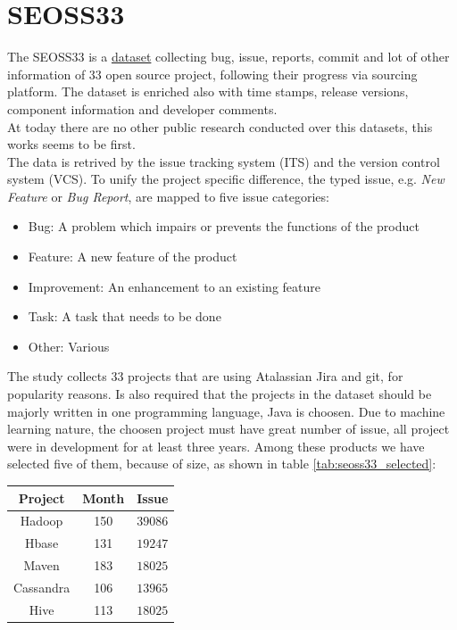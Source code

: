 \documentclass[%
    corpo=12pt,
    twoside,
    oldstyle,
    autoretitolo,
    greek,
    evenboxes,
]{toptesi}
\begin{document}
\section{SEOSS33}
The SEOSS33\cite{SEOSS33} is a \href{https://doi.org/10.7910/DVN/PDDZ4Q}{dataset} collecting bug, issue, reports, commit and lot of other information of 33 open source project, following their progress via sourcing platform. The dataset is enriched also with time stamps, release versions, component information and developer comments.\\
At today there are no other public research conducted over this datasets, this works seems to be first.\\
The data is retrived by the issue tracking system (ITS) and the version control system (VCS).
To unify the project specific difference, the typed issue, e.g. \textit{New Feature} or \textit{Bug Report}, are mapped to five issue categories:
\begin{itemize}
  \item Bug: A problem which impairs or prevents the functions of the product
  \item Feature: A new feature of the product
  \item Improvement: An enhancement to an existing feature
  \item Task: A task that needs to be done
  \item Other: Various
\end{itemize}
The study collects 33 projects that are using Atalassian Jira and git, for popularity reasons. Is also required that the projects in the dataset should be majorly written in one programming language, Java is choosen. Due to machine learning nature, the choosen project must have great number of issue, all project were in development for at least three years. Among these products we have selected five of them, because of size, as shown in table \ref{tab:seoss33_selected}:

\begin{center}
   \label{tab:seoss33_selected}
  \begin{tabular}{ |c|c|c| }
     \hline
     \textbf{Project} & \textbf{Month} & \textbf{Issue} \\
     \hline
     \hline
     Hadoop & 150 & $39086$ \\
     Hbase & 131 & $19247$ \\
     Maven & 183 & $18025$ \\
     Cassandra & 106 & $13965$ \\
     Hive & 113 & $18025$ \\
     \hline
  \end{tabular}
\end{center}
\end{document}
